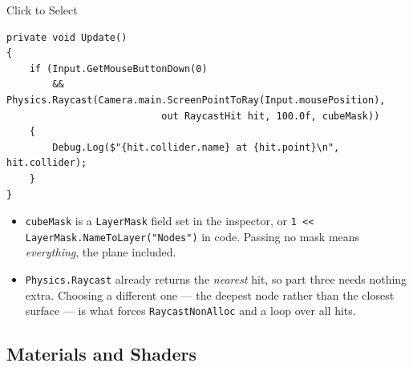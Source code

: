 \begin{solutionframe}{Click to Select}
  \begin{lstlisting}[basicstyle=\scriptsize\ttfamily]
private void Update()
{
    if (Input.GetMouseButtonDown(0)
        && Physics.Raycast(Camera.main.ScreenPointToRay(Input.mousePosition),
                           out RaycastHit hit, 100.0f, cubeMask))
    {
        Debug.Log($"{hit.collider.name} at {hit.point}\n", hit.collider);
    }
}
  \end{lstlisting}
  \vspace{0.5ex}

  \begin{itemize}
    \item \texttt{cubeMask} is a \texttt{LayerMask} field set in the inspector,
      or \texttt{1 << LayerMask.NameToLayer("Nodes")} in code. Passing no mask
      means \emph{everything}, the plane included.
    \item \texttt{Physics.Raycast} already returns the \emph{nearest} hit, so
      part three needs nothing extra. Choosing a different one --- the deepest
      node rather than the closest surface --- is what forces
      \texttt{RaycastNonAlloc} and a loop over all hits.
  \end{itemize}
\end{solutionframe}

\subsection{Materials and Shaders}

